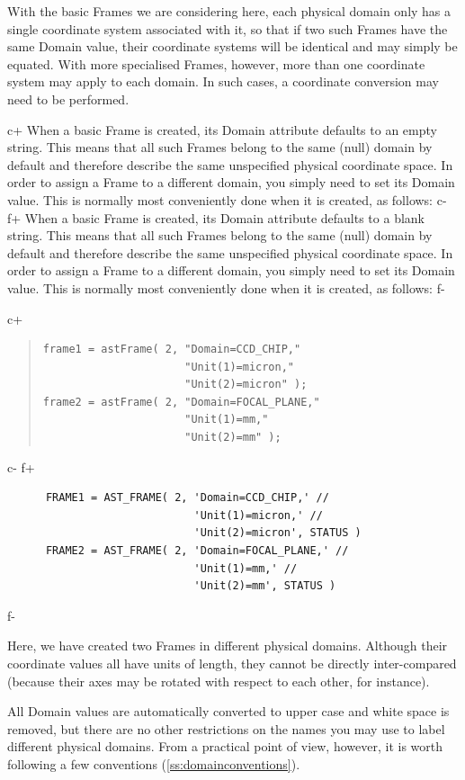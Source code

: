 \documentclass[twoside,11pt]{article}
\newcommand{\secref}[1]{\S\ref{#1}}
\renewcommand{\secref}[1]{\ref{#1}}
\begin{document}
With the basic Frames we are considering here, each physical domain
only has a single coordinate system associated with it, so that if two
such Frames have the same Domain value, their coordinate systems will
be identical and may simply be equated. With more specialised Frames,
however, more than one coordinate system may apply to each domain. In
such cases, a coordinate conversion may need to be performed.

c+
When a basic Frame is created, its Domain attribute defaults to an
empty string. This means that all such Frames belong to the same
(null) domain by default and therefore describe the same unspecified
physical coordinate space. In order to assign a Frame to a different
domain, you simply need to set its Domain value. This is normally most
conveniently done when it is created, as follows:
c-
f+
When a basic Frame is created, its Domain attribute defaults to a
blank string. This means that all such Frames belong to the same
(null) domain by default and therefore describe the same unspecified
physical coordinate space. In order to assign a Frame to a different
domain, you simply need to set its Domain value. This is normally most
conveniently done when it is created, as follows:
f-

c+
\begin{quote}
\small
\begin{verbatim}
frame1 = astFrame( 2, "Domain=CCD_CHIP,"
                      "Unit(1)=micron,"
                      "Unit(2)=micron" );
frame2 = astFrame( 2, "Domain=FOCAL_PLANE,"
                      "Unit(1)=mm,"
                      "Unit(2)=mm" );
\end{verbatim}
\normalsize
\end{quote}
c-
f+
\small
\begin{verbatim}
      FRAME1 = AST_FRAME( 2, 'Domain=CCD_CHIP,' //
                             'Unit(1)=micron,' //
                             'Unit(2)=micron', STATUS )
      FRAME2 = AST_FRAME( 2, 'Domain=FOCAL_PLANE,' //
                             'Unit(1)=mm,' //
                             'Unit(2)=mm', STATUS )
\end{verbatim}
\normalsize
f-

Here, we have created two Frames in different physical
domains. Although their coordinate values all have units of length,
they cannot be directly inter-compared (because their axes may be
rotated with respect to each other, for instance).

All Domain values are automatically converted to upper case and white
space is removed, but there are no other restrictions on the names you
may use to label different physical domains. From a practical point of
view, however, it is worth following a few conventions
(\secref{ss:domainconventions}).
\end{document}
